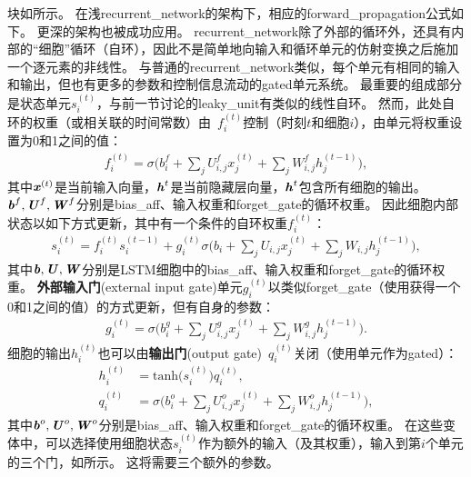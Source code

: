 块如所示。
在浅\gls{recurrent_network}的架构下，相应的\gls{forward_propagation}公式如下。
更深的架构也被成功应用\citep{Graves-et-al-ICASSP2013,Pascanu-et-al-ICLR2014}。
\gls{recurrent_network}除了外部的循环外，还具有内部的``细胞''循环（自环），因此不是简单地向输入和循环单元的仿射变换之后施加一个逐元素的非线性。
与普通的\gls{recurrent_network}类似，每个单元有相同的输入和输出，但也有更多的参数和控制信息流动的\gls{gated}单元系统。
最重要的组成部分是状态单元$s_i^{(t)}$，与前一节讨论的\gls{leaky_unit}有类似的线性自环。
然而，此处自环的权重（或相关联的时间常数）由~$f_i^{(t)}$控制（时刻$t$和细胞$i$），由单元将权重设置为0和1之间的值：
\begin{align}
 f_i^{(t)} = \sigma \Big( b_i^f + \sum_j U_{i,j}^f x_j^{(t)} + \sum_j W_{i,j}^f h_j^{(t-1)} \Big),
\end{align}
其中$\boldsymbol{\mathit{x}}^{(t)}$是当前输入向量，$\boldsymbol{\mathit{h}}^{t}$是当前隐藏层向量，$\boldsymbol{\mathit{h}}^{t}$包含所有细胞的输出。 
$\boldsymbol{\mathit{b}}^f, \boldsymbol{\mathit{U}}^f, \boldsymbol{\mathit{W}}^f$分别是\gls{bias_aff}、输入权重和\gls{forget_gate}的循环权重。
因此细胞内部状态以如下方式更新，其中有一个条件的自环权重$f_i^{(t)}$：
\begin{align}
 s_i^{(t)} = f_i^{(t)}  s_i^{(t-1)} +  g_i^{(t)}
 \sigma \Big( b_i + \sum_j U_{i,j} x_j^{(t)} + \sum_j W_{i,j} h_j^{(t-1)} \Big),
\end{align}
其中$\boldsymbol{\mathit{b}}, \boldsymbol{\mathit{U}}, \boldsymbol{\mathit{W}}$分别是LSTM细胞中的\gls{bias_aff}、输入权重和\gls{forget_gate}的循环权重。
\textbf{外部输入门}(external input gate)单元$g_i^{(t)}$以类似\gls{forget_gate}（使用获得一个0和1之间的值）的方式更新，但有自身的参数：
\begin{align}
 g_i^{(t)} = \sigma \Big( b_i^g + \sum_j U_{i,j}^g x_j^{(t)} + \sum_j W_{i,j}^g h_j^{(t-1)} \Big).
\end{align}
细胞的输出$h_i^{(t)}$也可以由\textbf{输出门}(output gate)~$q_i^{(t)}$关闭（使用单元作为\gls{gated}）：
\begin{align}
 h_i^{(t)} &= \text{tanh}\big( s_i^{(t)} \big) q_i^{(t)}, \\
 q_i^{(t)} &= \sigma \Big( b_i^o + \sum_j U_{i,j}^o x_j^{(t)} + \sum_j W_{i,j}^o h_j^{(t-1)} \Big),
\end{align}
其中$\boldsymbol{\mathit{b}}^o, \boldsymbol{\mathit{U}}^o, \boldsymbol{\mathit{W}}^o$分别是\gls{bias_aff}、输入权重和\gls{forget_gate}的循环权重。
在这些变体中，可以选择使用细胞状态$s_i^{(t)}$作为额外的输入（及其权重），输入到第$i$个单元的三个门，如所示。
这将需要三个额外的参数。

